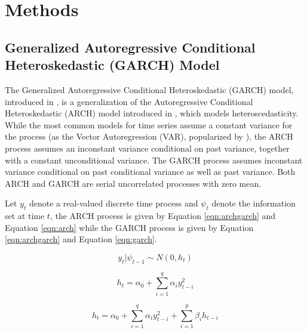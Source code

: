\documentclass[cic,tc, english]{iiufrgs}
\begin{document}
    \begin{comment}
        On ten of October 2015 a impeachment request for president Dilma Rousseff was handed to the Chamber Of Representatives' president, who accepted the request on December second. The opening of the impeachment process was accepted by the special impeachment committee on eleven of April 2016.
    \end{comment}

\section{Methods} \label{chapter_methods}

\subsection{Generalized Autoregressive Conditional Heteroskedastic (GARCH) Model}

    The Generalized Autoregressive Conditional Heteroskedastic (GARCH) model, introduced in \citet{bollerslev1986}, is a generalization of the Autoregressive Conditional Heteroskedastic (ARCH) model introduced in \citet{engle1982}, which models heteroscedasticity. While the most common models for time series assume a constant variance for the process (as the Vector Autoregression (VAR), popularized by \citet{var}), the ARCH process assumes an inconstant variance conditional on past variance, together with a constant unconditional variance. The GARCH process assumes inconstant variance conditional on past conditional variance as well as past variance. Both ARCH and GARCH are serial uncorrelated processes with zero mean.

    Let $y_t$ denote a real-valued discrete time process and $\psi_t$ denote the information set at time $t$, the ARCH process is given by Equation \ref{eqn:archgarch} and Equation \ref{eqn:arch} while the GARCH process is given by Equation \ref{eqn:archgarch} and Equation \ref{eqn:garch}.

    \begin{equation}
        \label{eqn:archgarch}
        y_t | \psi_{t-1} \sim N(0,h_t)
    \end{equation}

    \begin{equation}
        \label{eqn:arch}
        h_t = \alpha_0 + \displaystyle\sum_{i=1}^{q} \alpha_i y_{t-i}^2
    \end{equation}

    \begin{equation}
        \label{eqn:garch}
        h_t = \alpha_0 + \displaystyle\sum_{i=1}^{q} \alpha_i y_{t-i}^2 + \displaystyle\sum_{i=1}^{p} \beta_i h_{t-i}
    \end{equation}
\end{document}
